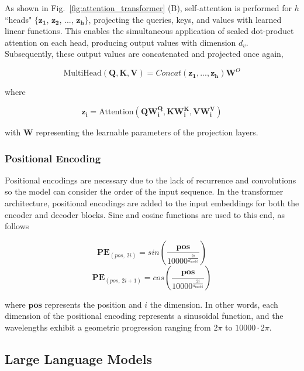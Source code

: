 As shown in Fig.~\ref{fig:attention_transformer} (B), self-attention is performed for $h$ ``heads" $\{\bm{z_1}$, $\bm{z_2}$, ..., $\bm{z_h}\}$, projecting the queries, keys, and values with learned linear functions. This enables the simultaneous application of scaled dot-product attention on each head, producing output values with dimension $d_v$. Subsequently, these output values are concatenated and projected once again,

\begin{equation}
    \text{MultiHead}(\bm{Q},\bm{K},\bm{V}) = Concat(\bm{z_1}, ..., \bm{z_h}) \bm{W}^O
\end{equation}

where 

\begin{equation}
\bm{z_i} = \text{Attention}(\bm{Q}\bm{W_i^Q},\bm{K}\bm{W_i^K},\bm{V}\bm{W_i^V})
 \end{equation}

with $\bm{W}$ representing the learnable parameters of the projection layers.

\subsubsection{Positional Encoding}

Positional encodings are necessary due to the lack of recurrence and convolutions so the model can consider the order of the input sequence. In the transformer architecture, positional encodings are added to the input embeddings for both the encoder and decoder blocks. Sine and cosine functions are used to this end, as follows

\begin{equation}
    \bm{PE}_{(pos, \, 2i)} = sin \left( \frac{\bm{pos}}{10000^{\frac{2i}{d_{\text{model}}}}} \right)
\end{equation}
\begin{equation}
    \bm{PE}_{(pos, \, 2i+1)} = cos \left( \frac{\bm{pos}}{10000^{\frac{2i}{d_{\text{model}}}}} \right)
\end{equation}

where $\bm{pos}$ represents the position and $i$ the dimension. In other words, each dimension of the positional encoding represents a sinusoidal function, and the wavelengths exhibit a geometric progression ranging from $2\pi$ to $10000 \cdot 2\pi$.

\subsection{Large Language Models}


